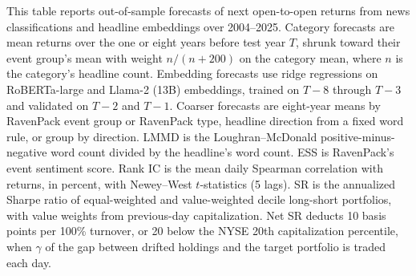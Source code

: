 \begin{table}[htbp]
\centering
\caption{Return Forecasts from Event Categories and Headline Embeddings}
\label{tab:tab1}
\begin{minipage}{\linewidth}\footnotesize
This table reports out-of-sample forecasts of next open-to-open returns from news classifications and headline embeddings over 2004--2025. Category forecasts are mean returns over the one or eight years before test year $T$, shrunk toward their event group's mean with weight $n/(n+200)$ on the category mean, where $n$ is the category's headline count. Embedding forecasts use ridge regressions on RoBERTa-large and Llama-2 (13B) embeddings, trained on $T-8$ through $T-3$ and validated on $T-2$ and $T-1$. Coarser forecasts are eight-year means by RavenPack event group or RavenPack type, headline direction from a fixed word rule, or group by direction. LMMD is the Loughran--McDonald positive-minus-negative word count divided by the headline's word count. ESS is RavenPack's event sentiment score. Rank IC is the mean daily Spearman correlation with returns, in percent, with Newey--West $t$-statistics (5 lags). SR is the annualized Sharpe ratio of equal-weighted and value-weighted decile long-short portfolios, with value weights from previous-day capitalization. Net SR deducts 10 basis points per 100\% turnover, or 20 below the NYSE 20th capitalization percentile, when $\gamma$ of the gap between drifted holdings and the target portfolio is traded each day.
\end{minipage}
\medskip


\end{table}
